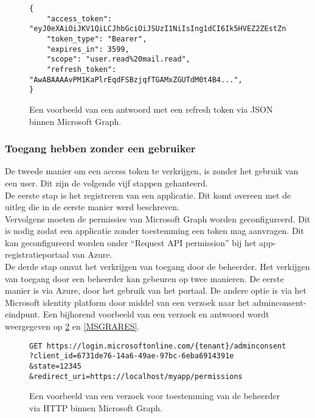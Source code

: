 \begin{figure}[!h]
    \footnotesize\begin{verbatim}
{
    "access_token": "eyJ0eXAiOiJKV1QiLCJhbGciOiJSUzI1NiIsIng1dCI6Ik5HVEZ2ZEstZnl0aEV1Q...",
    "token_type": "Bearer",
    "expires_in": 3599,
    "scope": "user.read%20mail.read",
    "refresh_token": "AwABAAAAvPM1KaPlrEqdFSBzjqfTGAMxZGUTdM0t4B4...",
}    
    \end{verbatim}    
    \caption[Voorbeeld Refresh Token response Microsoft Graph]{Een voorbeeld van een antwoord met een refresh token via \ac{JSON} binnen Microsoft Graph.}
    \label{MSGRTRES}
\end{figure}

\subsubsection{Toegang hebben zonder een gebruiker}

De tweede manier om een access token te verkrijgen, is zonder het gebruik van een user. Dit zijn de volgende vijf stappen gehanteerd. \\

De eerste stap is het registreren van een applicatie. Dit komt overeen met de uitleg die in de eerste manier werd beschreven. \\

Vervolgens moeten de permissies van Microsoft Graph worden geconfigureerd. Dit is nodig zodat een applicatie zonder toestemming een token mag aanvragen. Dit kan geconfigureerd worden onder “Request \ac{API} permission” bij het app-registratieportaal van Azure. \\

De derde stap omvat het verkrijgen van toegang door de beheerder. Het verkijgen van toegang door een beheerder kan gebeuren op twee manieren. De eerste manier is via Azure, door het gebruik van het portaal. De andere optie is via het Microsoft identity platform door middel van een verzoek naar het adminconsent-eindpunt. Een bijhorend voorbeeld van een verzoek en antwoord wordt weergegeven op \ref{MSGRAR} en \ref{MSGRARES}. \\

\begin{figure}[!h]
    \footnotesize\begin{verbatim}
GET https://login.microsoftonline.com/{tenant}/adminconsent
?client_id=6731de76-14a6-49ae-97bc-6eba6914391e
&state=12345
&redirect_uri=https://localhost/myapp/permissions
    \end{verbatim}    
    \caption[Voorbeeld Adminconsent request Microsoft Graph]{Een voorbeeld van een verzoek voor toestemming van de beheerder via \ac{HTTP} binnen Microsoft Graph.}
    \label{MSGRAR}
\end{figure}

